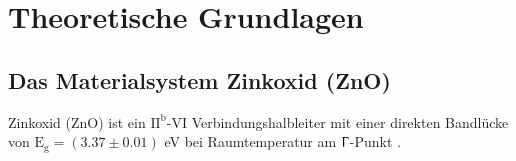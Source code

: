 \chapter{Theoretische Grundlagen} \section{Das Materialsystem Zinkoxid (ZnO)}
\label{ZnOMat} Zinkoxid (ZnO) ist ein $\text{II}^\text{b}$-VI
Verbindungshalbleiter mit einer direkten Bandlücke von  $\text{E}_\text{g}=
(\text{3.37} \pm \text{0.01})$ eV bei Raumtemperatur am $\Upgamma$-Punkt
\cite{Klingshirn.2010}.
